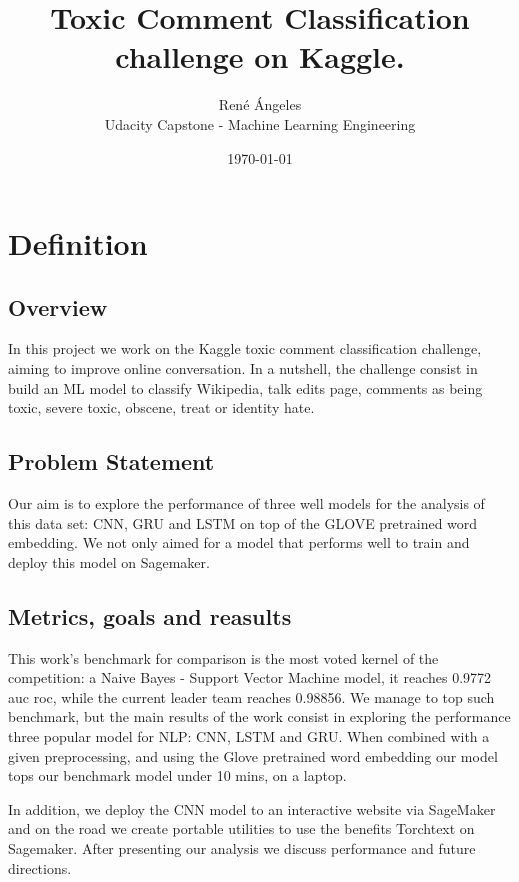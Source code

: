 \documentclass[book,preprintnumbers,11pt]{article}
\begin{document}
\title{Toxic Comment Classification challenge on Kaggle.}
\author{Ren\'e  \'Angeles\\
  Udacity Capstone - Machine Learning Engineering \\
  }
\date{\today}
\maketitle


\section{Definition}

\subsection{Overview}

In this project we work on the Kaggle toxic comment classification challenge, aiming to improve 
online conversation. In a nutshell, the challenge consist in build an ML model to classify 
Wikipedia, talk edits page, comments as being toxic, severe toxic, obscene, treat or identity hate.


\subsection{Problem Statement}

Our aim is to explore the performance of three well models for the analysis of
this data set: CNN, GRU and LSTM on top of the GLOVE pretrained word embedding. 
We not only aimed for a model that performs well to train and deploy this model 
on Sagemaker. 

\subsection{Metrics, goals and reasults}

This work's benchmark for comparison is the most voted
kernel of the competition: a Naive Bayes - Support Vector Machine model, it reaches 0.9772 auc roc,
while the current leader team reaches 0.98856. We manage to top such benchmark, but the main 
results of the work consist in exploring the performance three popular model for NLP:  CNN, LSTM and GRU.
When combined with a given preprocessing, and using the Glove pretrained word embedding our model tops 
our benchmark model under 10 mins, on a laptop.

In addition, we deploy the CNN model to an interactive website via SageMaker and on the road 
we create portable utilities to use the benefits Torchtext on Sagemaker. 
After presenting our analysis we discuss performance and future directions. 
\end{document}
